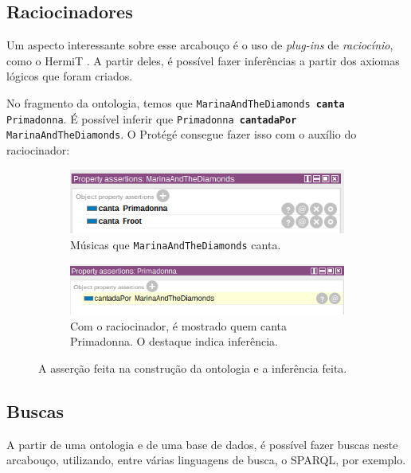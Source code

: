 \subsection{Raciocinadores}

Um aspecto interessante sobre esse arcabouço é o uso de \textit{plug-ins} de \textit{raciocínio}, como o HermiT \cite{ferramentasHermit}. A partir deles, é possível fazer inferências a partir dos axiomas lógicos que foram criados.

No fragmento da ontologia, temos que \texttt{MarinaAndTheDiamonds \textbf{canta} Primadonna}. É possível inferir que \texttt{Primadonna \textbf{cantadaPor} MarinaAndTheDiamonds}. O Protégé consegue fazer isso com o auxílio do raciocinador:

\begin{figure}[H]
	\centering
	\begin{subfigure}{.5\textwidth}
		\centering
		\includegraphics[width=0.9\linewidth]{Capitulos/Ferramentas/marinacanta}
		\caption{Músicas que \texttt{MarinaAndTheDiamonds} canta.}
	\end{subfigure}%
	\begin{subfigure}{.5\textwidth}
		\centering
		\includegraphics[width=0.95\linewidth]{Capitulos/Ferramentas/inferencia}
		\caption{Com o raciocinador, é mostrado quem canta Primadonna. O destaque indica inferência.}
	\end{subfigure}
	\caption{A asserção feita na construção da ontologia e a inferência feita.}
\end{figure}

\subsection{Buscas}

A partir de uma ontologia e de uma base de dados, é possível fazer buscas neste arcabouço, utilizando, entre várias linguagens de busca, o SPARQL, por exemplo.

